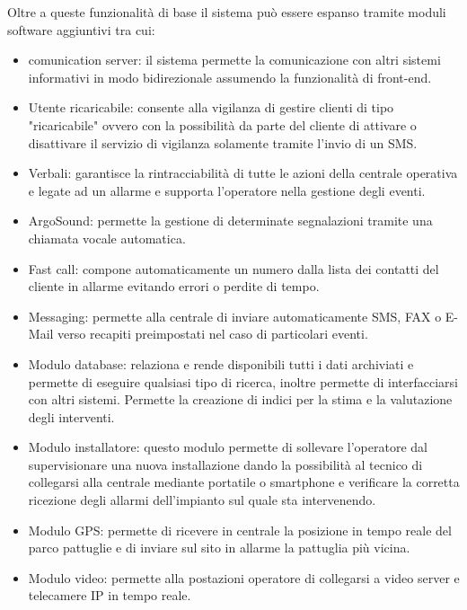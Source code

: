 Oltre a queste funzionalità di base il sistema può essere espanso tramite moduli software aggiuntivi tra cui:
\begin{itemize}
	\item comunication server: il sistema permette la comunicazione con altri sistemi informativi in modo bidirezionale assumendo la funzionalità di front-end.
	\item Utente ricaricabile: consente alla vigilanza di gestire clienti di tipo "ricaricabile" ovvero con la possibilità da parte del cliente di attivare o disattivare il servizio di vigilanza solamente tramite l'invio di un SMS.
	\item Verbali: garantisce la rintracciabilità di tutte le azioni della centrale operativa e legate ad un allarme e supporta l'operatore nella gestione degli eventi.
	\item ArgoSound: permette la gestione di determinate segnalazioni tramite una chiamata vocale automatica.
	\item Fast call: compone automaticamente un numero dalla lista dei contatti del cliente in allarme evitando errori o perdite di tempo.
	\item Messaging: permette alla centrale di inviare automaticamente SMS, FAX o E-Mail verso recapiti preimpostati nel caso di particolari eventi.
	\item Modulo database: relaziona e rende disponibili tutti i dati archiviati e permette di eseguire qualsiasi tipo di ricerca, inoltre permette di interfacciarsi con altri sistemi. Permette la creazione di indici per la stima e la valutazione degli interventi.
	\item  Modulo installatore: questo modulo permette di sollevare l'operatore dal supervisionare una nuova installazione dando la possibilità al tecnico di collegarsi alla centrale mediante portatile o smartphone e verificare la corretta ricezione degli allarmi dell'impianto sul quale sta intervenendo.
	\item Modulo GPS: permette di ricevere in centrale la posizione in tempo reale del parco pattuglie e di inviare sul sito in allarme la pattuglia più vicina.
	\item Modulo video: permette alla postazioni operatore di collegarsi a video server e telecamere IP in tempo reale.
\end{itemize}
